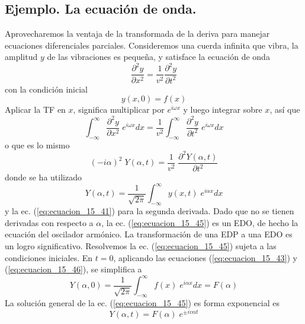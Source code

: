\subsection*{Ejemplo. La ecuación de onda.}
Aprovecharemos la ventaja de la transformada de la deriva para manejar ecuaciones diferenciales parciales. Consideremos una cuerda infinita que vibra, la amplitud $y$ de las vibraciones es pequeña, y satisface la ecuación de onda
\begin{equation}
\dfrac{\partial^{2} y}{\partial x^{2}} = \dfrac{1}{v^{2}} \dfrac{\partial^{2} y}{\partial t^{2}}
\label{eq:ecuacion_15_42}
\end{equation}
con la condición inicial
\begin{equation}
y(x,0) = f(x)
\label{eq:ecuacion_15_43}
\end{equation}
Aplicar la TF en $x$, significa multiplicar por $e^{i \omega x}$ y luego integrar sobre $x$, así que
\begin{equation}
\int_{-\infty}^{\infty} \dfrac{\partial^{2} y}{\partial x^{2}} \; e^{i \omega x} dx = \dfrac{1}{v^{2}} \int_{-\infty}^{\infty} \dfrac{\partial^{2} y}{\partial t^{2}} \; e^{i \omega x} dx
\label{eq:ecuacion_15_44}
\end{equation}
o que es lo mismo
\begin{equation}
(-i \alpha)^{2} \; Y(\alpha, t) = \dfrac{1}{v^{2}} \; \dfrac{\partial^{2} Y(\alpha, t)}{\partial t^{2}}
\label{eq:ecuacion_15_45}
\end{equation}
donde se ha utilizado
\begin{equation}
Y(\alpha, t) = \dfrac{1}{\sqrt{2 \pi}} \int_{-\infty}^{\infty} y(x, t) \; e^{i \alpha x} dx
\label{eq:ecuacion_15_46}
\end{equation}
y la ec. (\ref{eq:ecuacion_15_41}) para la segunda derivada. Dado que no se tienen derivadas con respecto a $\alpha$, la ec. (\ref{eq:ecuacion_15_45}) es un EDO, de hecho la ecuación del oscilador armónico. La transformación de una EDP a una EDO es un logro significativo. Resolvemos la ec. (\ref{eq:ecuacion_15_45}) sujeta a las condiciones iniciales. En $t=0$, aplicando las ecuaciones (\ref{eq:ecuacion_15_43}) y (\ref{eq:ecuacion_15_46}), se simplifica a
\begin{equation}
Y(\alpha, 0) = \dfrac{1}{\sqrt{2 \pi}} \int_{-\infty}^{\infty} f(x) \; e^{i \alpha x} dx =  F(\alpha)
\label{eq:ecuacion_15_47}
\end{equation}
La solución general de la ec. (\ref{eq:ecuacion_15_45}) es forma exponencial es
\begin{equation}
Y(\alpha, t) = F(\alpha) \; e^{\pm i v \alpha t}
\label{eq:ecuacion_15_48}
\end{equation}

